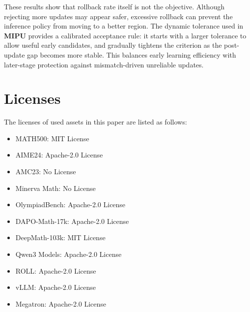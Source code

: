 \documentclass{article}
\begin{document}
These results show that rollback rate itself is not the objective. 
Although rejecting more updates may appear safer, excessive rollback can prevent the inference policy from moving to a better region. 
The dynamic tolerance used in \textbf{MIPU} provides a calibrated acceptance rule: it starts with a larger tolerance to allow useful early candidates, and gradually tightens the criterion as the post-update gap becomes more stable. 
This balances early learning efficiency with later-stage protection against mismatch-driven unreliable updates.



\section{Licenses}
\label{app:licenses}

The licenses of used assets in this paper are listed as follows:
\begin{itemize}
    \item MATH500: MIT License
    \item AIME24: Apache-2.0 License
    \item AMC23: No License
    \item Minerva Math: No License
    \item OlympiadBench: Apache-2.0 License
    \item DAPO-Math-17k: Apache-2.0 License
    \item DeepMath-103k: MIT License
    \item Qwen3 Models: Apache-2.0 License
    \item ROLL: Apache-2.0 License
    \item vLLM: Apache-2.0 License
    \item Megatron: Apache-2.0 License
\end{itemize}

\end{document}
